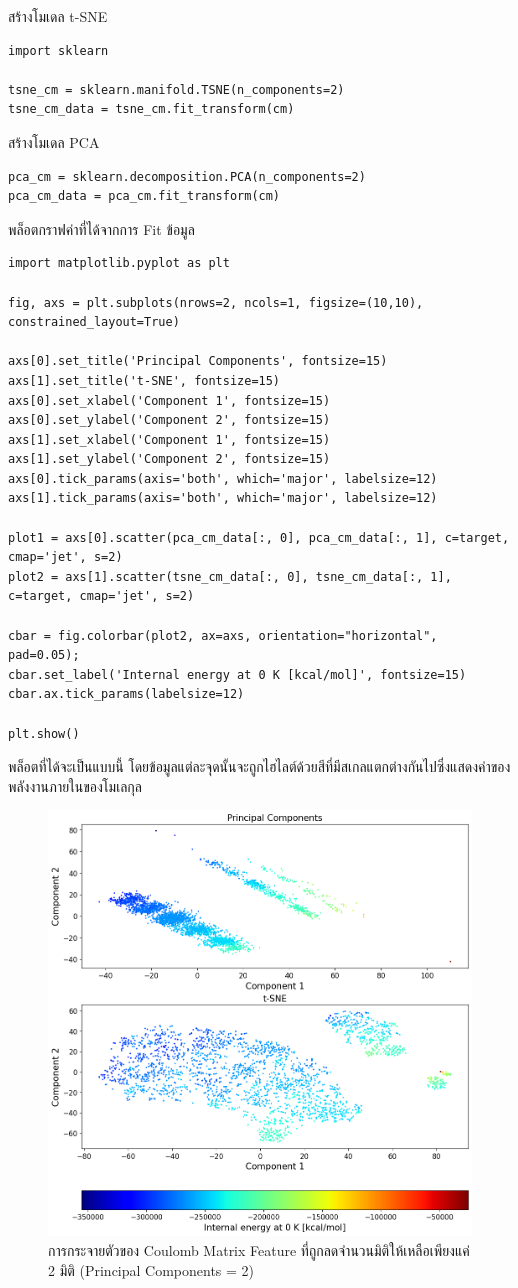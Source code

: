 \noindent สร้างโมเดล t-SNE
\begin{lstlisting}[style=MyPython]
import sklearn

tsne_cm = sklearn.manifold.TSNE(n_components=2)
tsne_cm_data = tsne_cm.fit_transform(cm)
\end{lstlisting}

\noindent สร้างโมเดล PCA
\begin{lstlisting}[style=MyPython]
pca_cm = sklearn.decomposition.PCA(n_components=2)
pca_cm_data = pca_cm.fit_transform(cm)
\end{lstlisting}

\noindent พล็อตกราฟค่าที่ได้จากการ Fit ข้อมูล
\begin{lstlisting}[style=MyPython]
import matplotlib.pyplot as plt

fig, axs = plt.subplots(nrows=2, ncols=1, figsize=(10,10), constrained_layout=True)

axs[0].set_title('Principal Components', fontsize=15)
axs[1].set_title('t-SNE', fontsize=15)
axs[0].set_xlabel('Component 1', fontsize=15)
axs[0].set_ylabel('Component 2', fontsize=15)
axs[1].set_xlabel('Component 1', fontsize=15)
axs[1].set_ylabel('Component 2', fontsize=15)
axs[0].tick_params(axis='both', which='major', labelsize=12)
axs[1].tick_params(axis='both', which='major', labelsize=12)

plot1 = axs[0].scatter(pca_cm_data[:, 0], pca_cm_data[:, 1], c=target, cmap='jet', s=2)
plot2 = axs[1].scatter(tsne_cm_data[:, 0], tsne_cm_data[:, 1], c=target, cmap='jet', s=2)

cbar = fig.colorbar(plot2, ax=axs, orientation="horizontal", pad=0.05);
cbar.set_label('Internal energy at 0 K [kcal/mol]', fontsize=15)
cbar.ax.tick_params(labelsize=12)

plt.show()
\end{lstlisting}

\noindent พล็อตที่ได้จะเป็นแบบนี้ โดยข้อมูลแต่ละจุดนั้นจะถูกไฮไลต์ด้วยสีที่มีสเกลแตกต่างกันไปซึ่งแสดงค่าของพลังงานภายในของโมเลกุล

\begin{figure}[htbp]
    \centering
    \includegraphics[width=\linewidth]{fig/cm_pca_tsne.png}
    \caption{การกระจายตัวของ Coulomb Matrix Feature ที่ถูกลดจำนวนมิติให้เหลือเพียงแค่ 2 มิติ (Principal Components = 2)}
    \label{fig:cm_pca_tsne}
\end{figure}
